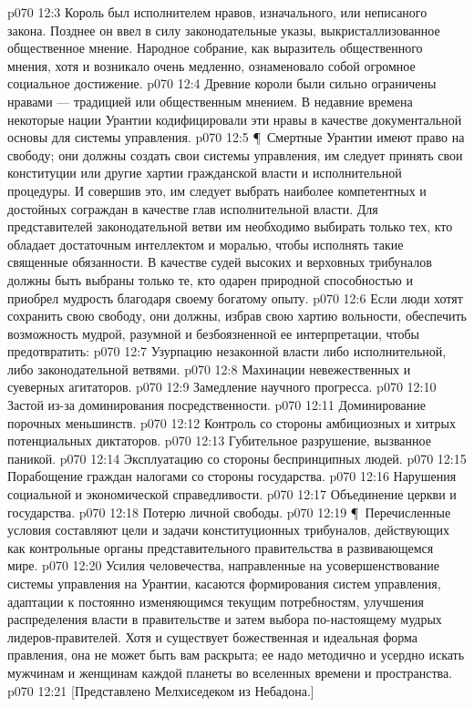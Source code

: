 \vs p070 12:3 Король был исполнителем нравов, изначального, или неписаного закона. Позднее он ввел в силу законодательные указы, выкристаллизованное общественное мнение. Народное собрание, как выразитель общественного мнения, хотя и возникало очень медленно, ознаменовало собой огромное социальное достижение.
\vs p070 12:4 Древние короли были сильно ограничены нравами --- традицией или общественным мнением. В недавние времена некоторые нации Урантии кодифицировали эти нравы в качестве документальной основы для системы управления.
\vs p070 12:5 \P\ Смертные Урантии имеют право на свободу; они должны создать свои системы управления, им следует принять свои конституции или другие хартии гражданской власти и исполнительной процедуры. И совершив это, им следует выбрать наиболее компетентных и достойных сограждан в качестве глав исполнительной власти. Для представителей законодательной ветви им необходимо выбирать только тех, кто обладает достаточным интеллектом и моралью, чтобы исполнять такие священные обязанности. В качестве судей высоких и верховных трибуналов должны быть выбраны только те, кто одарен природной способностью и приобрел мудрость благодаря своему богатому опыту.
\vs p070 12:6 Если люди хотят сохранить свою свободу, они должны, избрав свою хартию вольности, обеспечить возможность мудрой, разумной и безбоязненной ее интерпретации, чтобы предотвратить:
\vs p070 12:7 \bibnobreakspace Узурпацию незаконной власти либо исполнительной, либо законодательной ветвями.
\vs p070 12:8 \bibnobreakspace Махинации невежественных и суеверных агитаторов.
\vs p070 12:9 \bibnobreakspace Замедление научного прогресса.
\vs p070 12:10 \bibnobreakspace Застой из\hyp{}за доминирования посредственности.
\vs p070 12:11 \bibnobreakspace Доминирование порочных меньшинств.
\vs p070 12:12 \bibnobreakspace Контроль со стороны амбициозных и хитрых потенциальных диктаторов.
\vs p070 12:13 \bibnobreakspace Губительное разрушение, вызванное паникой.
\vs p070 12:14 \bibnobreakspace Эксплуатацию со стороны беспринципных людей.
\vs p070 12:15 \bibnobreakspace Порабощение граждан налогами со стороны государства.
\vs p070 12:16 \bibnobreakspace Нарушения социальной и экономической справедливости.
\vs p070 12:17 \bibnobreakspace Объединение церкви и государства.
\vs p070 12:18 \bibnobreakspace Потерю личной свободы.
\vs p070 12:19 \P\ Перечисленные условия составляют цели и задачи конституционных трибуналов, действующих как контрольные органы представительного правительства в развивающемся мире.
\vs p070 12:20 Усилия человечества, направленные на усовершенствование системы управления на Урантии, касаются формирования систем управления, адаптации к постоянно изменяющимся текущим потребностям, улучшения распределения власти в правительстве и затем выбора по\hyp{}настоящему мудрых лидеров\hyp{}правителей. Хотя и существует божественная и идеальная форма правления, она не может быть вам раскрыта; ее надо методично и усердно искать мужчинам и женщинам каждой планеты во вселенных времени и пространства.
\vs p070 12:21 [Представлено Мелхиседеком из Небадона.]
